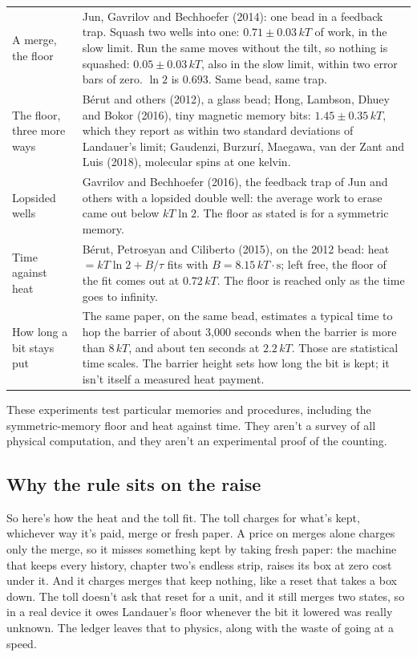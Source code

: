 \documentclass[11pt,twoside]{article}
\theoremstyle{thielethm}
\theoremstyle{thieledef}
\theoremstyle{thieledef}
\theoremstyle{thieledef}
\theoremstyle{thielethm}
\theoremstyle{thieleobs}
\theoremstyle{thielethm}
\begin{document}
\begingroup\small
\begin{longtable}{p{} p{}}
A merge, the floor & Jun, Gavrilov and Bechhoefer (2014): one bead in a feedback trap.
Squash two wells into one: $0.71 \pm 0.03\,kT$ of work, in the slow limit. Run the same
moves without the tilt, so nothing is squashed: $0.05 \pm 0.03\,kT$, also in the slow limit,
within two error bars of zero. $\ln 2$ is $0.693$. Same bead, same trap. \\[3pt]
The floor, three more ways & B\'erut and others (2012), a glass bead; Hong, Lambson, Dhuey
and Bokor (2016), tiny magnetic memory bits: $1.45 \pm 0.35\,kT$, which they report as
within two standard deviations of Landauer's limit;
Gaudenzi, Burzur\'i, Maegawa, van der Zant and Luis (2018), molecular spins at one kelvin. \\[3pt]
Lopsided wells & Gavrilov and Bechhoefer (2016), the feedback trap of Jun and others with a
lopsided double well: the average work to erase came out below $kT\ln 2$. The floor as
stated is for a symmetric memory. \\[3pt]
Time against heat & B\'erut, Petrosyan and Ciliberto (2015), on the 2012 bead: heat
$= kT\ln 2 + B/\tau$ fits with $B = 8.15\,kT\cdot\mathrm{s}$; left free, the floor of the fit
comes out at $0.72\,kT$. The floor is reached only as the time goes to infinity. \\[3pt]
How long a bit stays put & The same paper, on the same bead, estimates a typical time to hop the
barrier of about 3,000 seconds when the barrier is more than $8\,kT$, and about ten seconds at $2.2\,kT$. Those are
statistical time scales. The barrier height sets how long the bit is kept; it isn't itself
a measured heat payment. \\
\end{longtable}
\endgroup

These experiments test particular memories and procedures, including the symmetric-memory floor and heat against time. They aren't a survey of all physical computation, and they aren't an experimental proof of the counting.

\subsection{Why the rule sits on the raise}

So here's how the heat and the toll fit. The toll charges for what's kept, whichever way it's paid, merge or fresh paper. A price on merges alone charges only the merge, so it misses something kept by taking fresh paper: the machine that keeps every history, chapter two's endless strip, raises its box at zero cost under it. And it charges merges that keep nothing, like a reset that takes a box down. The toll doesn't ask that reset for a unit, and it still merges two states, so in a real device it owes Landauer's floor whenever the bit it lowered was really unknown. The ledger leaves that to physics, along with the waste of going at a speed.
\end{document}

